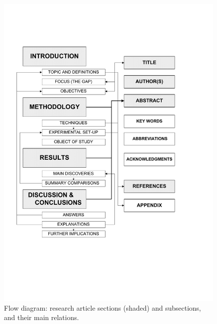 \documentclass[graybox,envcountchap,sectrefs,UStrade]{svmono}
\begin{document}
\begin{figure}[htb]
\begin{center}
\includegraphics[width=.9\textwidth]{Fig_RA_elem.pdf}
\caption{Flow diagram: research article sections (shaded) and subsections, and their main relations.} \label{Fig:paper}
\end{center}
\end{figure}
\end{document}
